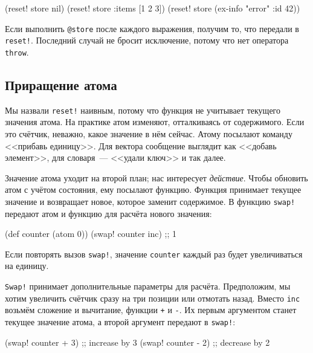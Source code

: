 \else

\begin{english}
  \begin{clojure}
(reset! store nil)
(reset! store {:items [1 2 3]})
(reset! store (ex-info "error" {:id 42}))
  \end{clojure}
\end{english}
\fi


Если выполнить \verb|@store| после каждого выражения, получим то, что передали
в \verb|reset!|. Последний случай не бросит исключение, потому что нет
оператора \verb|throw|.

\subsection{Приращение атома}


Мы назвали \verb|reset!| наивным, потому что функция не учитывает текущего
значения атома. На практике атом изменяют, отталкиваясь от содержимого. Если это
счётчик, неважно, какое значение в нём сейчас. Атому посылают команду <<прибавь
единицу>>. Для вектора сообщение выглядит как <<добавь элемент>>, для
словаря~--- <<удали ключ>> и так далее.

Значение атома уходит на второй план; нас интересует \emph{действие}. Чтобы
обновить атом с учётом состояния, ему посылают функцию. Функция принимает
текущее значение и возвращает новое, которое заменит содержимое. В функцию
\verb|swap!| передают атом и функцию для расчёта нового значения:


\begin{english}
  \begin{clojure}
(def counter (atom 0))
(swap! counter inc) ;; 1
  \end{clojure}
\end{english}

\noindent
Если повторять вызов \verb|swap!|, значение \verb|counter| каждый раз
будет увеличиваться на единицу.

\verb|Swap!| принимает дополнительные параметры для расчёта. Предположим, мы
хотим увеличить счётчик сразу на три позиции или отмотать назад. Вместо
\verb|inc| возьмём сложение и вычитание, функции \verb|+| и \verb|-|. Их
первым аргументом станет текущее значение атома, а второй аргумент передают в
\verb|swap!|:

\begin{english}
  \begin{clojure}
(swap! counter + 3) ;; increase by 3
(swap! counter - 2) ;; decrease by 2
  \end{clojure}
\end{english}

